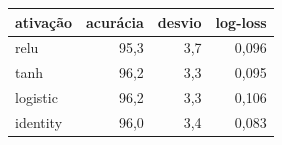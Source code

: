 
\begin{tabular}{lrrr}
\toprule
\textbf{ativação} & \textbf{acurácia} & \textbf{desvio} & \textbf{log-loss} \\
\midrule
relu & 95{,}3 & 3{,}7 & 0{,}096 \\
tanh & 96{,}2 & 3{,}3 & 0{,}095 \\
logistic & 96{,}2 & 3{,}3 & 0{,}106 \\
identity & 96{,}0 & 3{,}4 & 0{,}083 \\
\bottomrule
\end{tabular}
